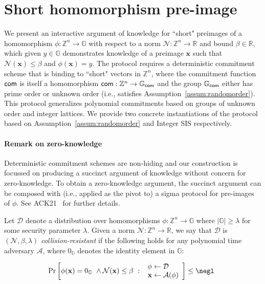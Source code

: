 \section{Short homomorphism pre-image}
We present an interactive argument of knowledge for ``short" preimages of a homomorphism $\phi: \mathbb{Z}^n \rightarrow \mathbb{G}$ with respect to a norm $\mathcal{N}: \mathbb{Z}^n \rightarrow \mathbb{R}$ and bound $\beta \in \mathbb{R}$, which given $y \in \mathbb{G}$ demonstrates knowledge of a preimage $\mathbf{x}$ such that $\mathcal{N}(\mathbf{x}) \leq \beta$ and $\phi(\mathbf{x}) = y$. The protocol requires a deterministic commitment scheme that is binding to ``short" vectors in $\mathbb{Z}^n$, where the commitment function $\mathsf{com}$ is itself a homomorphism $\mathsf{com}: \mathbb{Z}^n \rightarrow \mathbb{G}_{\mathsf{com}}$ and the group $\mathbb{G}_{\mathsf{com}}$ either has prime order or unknown order (i.e., satisfies Assumption~\ref{assum:randomorder}). This protocol generalizes polynomial commitments based on groups of unknown order and integer lattices. We provide two concrete instantiations of the protocol based on Assumption~\ref{assum:randomorder} and Integer SIS respectively.

\paragraph{Remark on zero-knowledge} Deterministic commitment schemes are non-hiding and our construction is focussed on producing a succinct argument of knowledge without concern for zero-knowledge. To obtain a zero-knowledge argument, the succinct argument can be composed with (i.e., applied as the pivot to) a sigma protocol for pre-images of $\phi$. See ACK21~\cite{C:AttCraKoh21} for further details. 

\begin{definition}
Let $\mathcal{D}$ denote a distribution over homomorphisms $\phi: \mathbb{Z}^n \rightarrow \mathbb{G}$ where $|\mathbb{G}| \geq \lambda$ for some security parameter $\lambda$. Given a norm $\mathcal{N}:\mathbb{Z}^n \rightarrow \mathbb{R}$, we say that $\mathcal{D}$ is \emph{$(\mathcal{N}, \beta, \lambda)$ collision-resistant} if the following holds for any polynomial time adversary $\mathcal{A}$, where $0_\mathbb{G}$ denotes the identity element in $\mathbb{G}$:
\begin{small}
\[
    \Pr\left[
        \phi(\mathbf{x}) = 0_\mathbb{G} \ \wedge \mathcal{N}(\mathbf{x}) \leq \beta \ : \
        \begin{array}{l}
             \phi \gets \mathcal{D} \\
            \mathbf{x} \gets \mathcal{A}(\phi)\\
        \end{array}
    \right] \leq \negl \enspace 
\]
\end{small}
\end{definition}
\fi 

